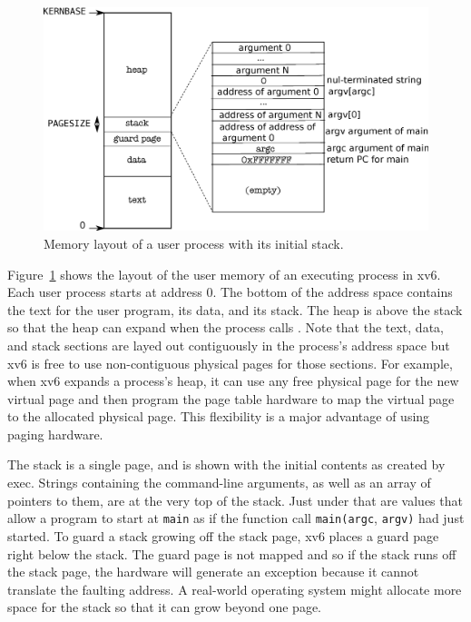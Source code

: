 \begin{figure}[t]
\center
\includegraphics[scale=0.5]{fig/processlayout.eps}
\caption{Memory layout of a user process with its initial stack.}
\label{fig:processlayout}
\end{figure}

Figure~\ref{fig:processlayout}
shows the layout of the user memory of an executing process in xv6.
Each user process starts at address 0. The bottom of the address space
contains the text for the user program, its data, and its stack.
The heap is above the stack so that the heap can expand when the process
calls
.
Note that the text, data, and stack sections are layed out contiguously in the
process's address space but xv6 is free to use non-contiguous physical pages for
those sections. For example, when xv6 expands a process's heap, it can use any
free physical page for the new virtual page and then program the page table
hardware to map the virtual page to the allocated physical page.  This
flexibility is a major advantage of using paging hardware.

The stack is a single page, and is
shown with the initial contents as created by exec.
Strings containing the command-line arguments, as well as an
array of pointers to them, are at the very top of the stack.
Just under that are values that allow a program
to start at
\lstinline{main}
as if the function call
\lstinline{main(argc},
\lstinline{argv)}
had just started.
To guard a stack growing off the stack page, xv6 places a guard page right below
the stack.  The guard page is not mapped and so if the stack runs off the stack
page, the hardware will generate an exception because it cannot translate the
faulting address.
A real-world operating system might allocate more space for the stack so that it can
grow beyond one page.

